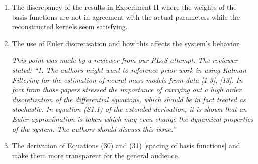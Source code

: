 \documentclass{article}
\begin{document}
    \begin{enumerate}
        \item The discrepancy of the results in Experiment II where the weights of the basis functions are not in agreement with the actual parameters while the reconstructed kernels seem satisfying.

        \item The use of Euler discretisation and how this affects the system's behavior.

		\emph{This point was made by a reviewer from our PLoS attempt. The reviewer stated: ``1. The authors might want to reference prior work in using Kalman
		Filtering for the estimation of neural mass models from data [1-3],
		[13]. In fact from those papers stressed the importance of carrying out
		a high order discretization of the differential equations, which should
		be in fact treated as stochastic. In equation (S1.1) of the extended
		derivation, it is shown that an Euler approximation is taken which may
		even change the dynamical properties of the system. The authors should
		discuss this issue.''}
		
        \item The derivation of Equations (30) and (31) [spacing of basis functions] and make them more transparent for the general audience.


\end{enumerate}
\end{document}
